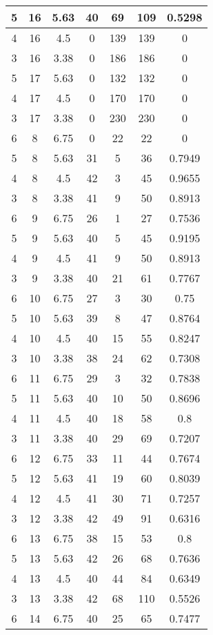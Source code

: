 \documentclass[letterpaper, 12pt]{article}
\begin{document}
\begin{longtable}{|c|c|c|c|c|c|c|}
\hline
5 & 16 & 5.63 & 40 & 69 & 109 & 0.5298 \\
\hline
4 & 16 & 4.5 & 0 & 139 & 139 & 0 \\
\hline
3 & 16 & 3.38 & 0 & 186 & 186 & 0 \\
\hline
5 & 17 & 5.63 & 0 & 132 & 132 & 0 \\
\hline
4 & 17 & 4.5 & 0 & 170 & 170 & 0 \\
\hline
3 & 17 & 3.38 & 0 & 230 & 230 & 0 \\
\hline
6 & 8 & 6.75 & 0 & 22 & 22 & 0 \\
\hline
5 & 8 & 5.63 & 31 & 5 & 36 & 0.7949 \\
\hline
4 & 8 & 4.5 & 42 & 3 & 45 & 0.9655 \\
\hline
3 & 8 & 3.38 & 41 & 9 & 50 & 0.8913 \\
\hline
6 & 9 & 6.75 & 26 & 1 & 27 & 0.7536 \\
\hline
5 & 9 & 5.63 & 40 & 5 & 45 & 0.9195 \\
\hline
4 & 9 & 4.5 & 41 & 9 & 50 & 0.8913 \\
\hline
3 & 9 & 3.38 & 40 & 21 & 61 & 0.7767 \\
\hline
6 & 10 & 6.75 & 27 & 3 & 30 & 0.75 \\
\hline
5 & 10 & 5.63 & 39 & 8 & 47 & 0.8764 \\
\hline
4 & 10 & 4.5 & 40 & 15 & 55 & 0.8247 \\
\hline
3 & 10 & 3.38 & 38 & 24 & 62 & 0.7308 \\
\hline
6 & 11 & 6.75 & 29 & 3 & 32 & 0.7838 \\
\hline
5 & 11 & 5.63 & 40 & 10 & 50 & 0.8696 \\
\hline
4 & 11 & 4.5 & 40 & 18 & 58 & 0.8 \\
\hline
3 & 11 & 3.38 & 40 & 29 & 69 & 0.7207 \\
\hline
6 & 12 & 6.75 & 33 & 11 & 44 & 0.7674 \\
\hline
5 & 12 & 5.63 & 41 & 19 & 60 & 0.8039 \\
\hline
4 & 12 & 4.5 & 41 & 30 & 71 & 0.7257 \\
\hline
3 & 12 & 3.38 & 42 & 49 & 91 & 0.6316 \\
\hline
6 & 13 & 6.75 & 38 & 15 & 53 & 0.8 \\
\hline
5 & 13 & 5.63 & 42 & 26 & 68 & 0.7636 \\
\hline
4 & 13 & 4.5 & 40 & 44 & 84 & 0.6349 \\
\hline
3 & 13 & 3.38 & 42 & 68 & 110 & 0.5526 \\
\hline
6 & 14 & 6.75 & 40 & 25 & 65 & 0.7477 \\

\end{longtable}
\end{document}
